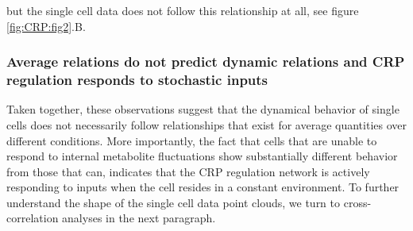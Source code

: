 but the single cell data does not follow this relationship at all, see figure \ref{fig:CRP:fig2}.B. 
%
%

\subsubsection*{Average relations do not predict dynamic relations and CRP regulation responds to stochastic inputs}

Taken together, these observations suggest that the dynamical behavior of single cells
does not necessarily follow relationships that exist for average quantities over different conditions. More importantly, the fact that cells that are unable to respond to internal metabolite fluctuations show substantially different behavior from those that can, indicates that the CRP regulation network is actively responding to inputs when the cell resides in a constant environment.
%
To further understand the shape of the single cell data point clouds, we turn to cross-correlation analyses in the next paragraph.

